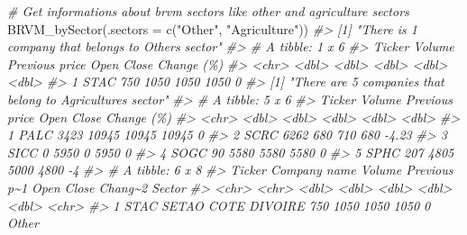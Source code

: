 \documentclass[
]{article}
\newenvironment{Shaded}{\begin{snugshade}}{\end{snugshade}}
\newcommand{\AttributeTok}[1]{\textcolor[rgb]{0.77,0.63,0.00}{#1}}
\newcommand{\CommentTok}[1]{\textcolor[rgb]{0.56,0.35,0.01}{\textit{#1}}}
\newcommand{\FunctionTok}[1]{\textcolor[rgb]{0.00,0.00,0.00}{#1}}
\newcommand{\NormalTok}[1]{#1}
\newcommand{\StringTok}[1]{\textcolor[rgb]{0.31,0.60,0.02}{#1}}
\begin{document}
\begin{Shaded}
\begin{Highlighting}[]
\CommentTok{\# Get informations about brvm sectors like other and agriculture sectors}
\FunctionTok{BRVM\_bySector}\NormalTok{(}\AttributeTok{.sectors =} \FunctionTok{c}\NormalTok{(}\StringTok{"Other"}\NormalTok{, }\StringTok{"Agriculture"}\NormalTok{))}
\CommentTok{\#\textgreater{} [1] "There is 1 company that belongs to Other\textquotesingle{}s sector"}
\CommentTok{\#\textgreater{} \# A tibble: 1 x 6}
\CommentTok{\#\textgreater{}   Ticker Volume \textasciigrave{}Previous price\textasciigrave{}  Open Close \textasciigrave{}Change (\%)\textasciigrave{}}
\CommentTok{\#\textgreater{}   \textless{}chr\textgreater{}   \textless{}dbl\textgreater{}            \textless{}dbl\textgreater{} \textless{}dbl\textgreater{} \textless{}dbl\textgreater{}        \textless{}dbl\textgreater{}}
\CommentTok{\#\textgreater{} 1 STAC      750             1050  1050  1050            0}
\CommentTok{\#\textgreater{} [1] "There are 5 companies that belong to Agriculture\textquotesingle{}s sector"}
\CommentTok{\#\textgreater{} \# A tibble: 5 x 6}
\CommentTok{\#\textgreater{}   Ticker Volume \textasciigrave{}Previous price\textasciigrave{}  Open Close \textasciigrave{}Change (\%)\textasciigrave{}}
\CommentTok{\#\textgreater{}   \textless{}chr\textgreater{}   \textless{}dbl\textgreater{}            \textless{}dbl\textgreater{} \textless{}dbl\textgreater{} \textless{}dbl\textgreater{}        \textless{}dbl\textgreater{}}
\CommentTok{\#\textgreater{} 1 PALC     3423            10945 10945 10945         0   }
\CommentTok{\#\textgreater{} 2 SCRC     6262              680   710   680        {-}4.23}
\CommentTok{\#\textgreater{} 3 SICC        0             5950     0  5950         0   }
\CommentTok{\#\textgreater{} 4 SOGC       90             5580  5580  5580         0   }
\CommentTok{\#\textgreater{} 5 SPHC      207             4805  5000  4800        {-}4}
\CommentTok{\#\textgreater{} \# A tibble: 6 x 8}
\CommentTok{\#\textgreater{}   Ticker \textasciigrave{}Company name\textasciigrave{}           Volume Previous p\textasciitilde{}1  Open Close Chang\textasciitilde{}2 Sector}
\CommentTok{\#\textgreater{}   \textless{}chr\textgreater{}  \textless{}chr\textgreater{}                     \textless{}dbl\textgreater{}        \textless{}dbl\textgreater{} \textless{}dbl\textgreater{} \textless{}dbl\textgreater{}   \textless{}dbl\textgreater{} \textless{}chr\textgreater{} }
\CommentTok{\#\textgreater{} 1 STAC   SETAO COTE D\textquotesingle{}IVOIRE         750         1050  1050  1050    0    Other }

\end{Highlighting}
\end{Shaded}
\end{document}
